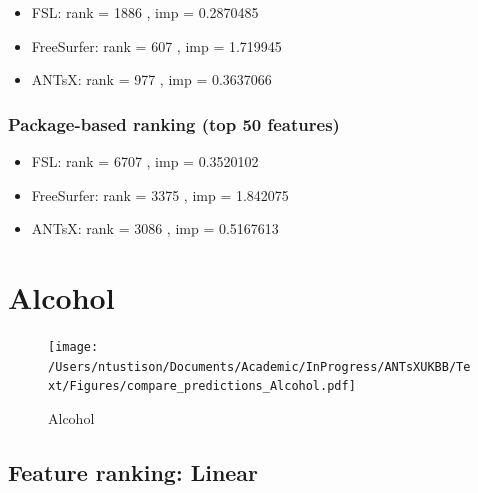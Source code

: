 \documentclass[
  10pt,
]{article}
\begin{document}
\begin{itemize}
\item
  FSL: rank = 1886 , imp = 0.2870485
\item
  FreeSurfer: rank = 607 , imp = 1.719945
\item
  ANTsX: rank = 977 , imp = 0.3637066
\end{itemize}

\hypertarget{package-based-ranking-top-50-features-10}{%
\subsubsection{Package-based ranking (top 50
features)}\label{package-based-ranking-top-50-features-10}}

\begin{itemize}
\item
  FSL: rank = 6707 , imp = 0.3520102
\item
  FreeSurfer: rank = 3375 , imp = 1.842075
\item
  ANTsX: rank = 3086 , imp = 0.5167613
\end{itemize}

\clearpage

\hypertarget{alcohol}{%
\section{Alcohol}\label{alcohol}}

\begin{figure}
\centering
\texttt{[image: /Users/ntustison/Documents/Academic/InProgress/ANTsXUKBB/Text/Figures/compare\_predictions\_Alcohol.pdf]}
\caption{Alcohol}
\end{figure}

\hypertarget{feature-ranking-linear-11}{%
\subsection{Feature ranking: Linear}\label{feature-ranking-linear-11}}
\end{document}
